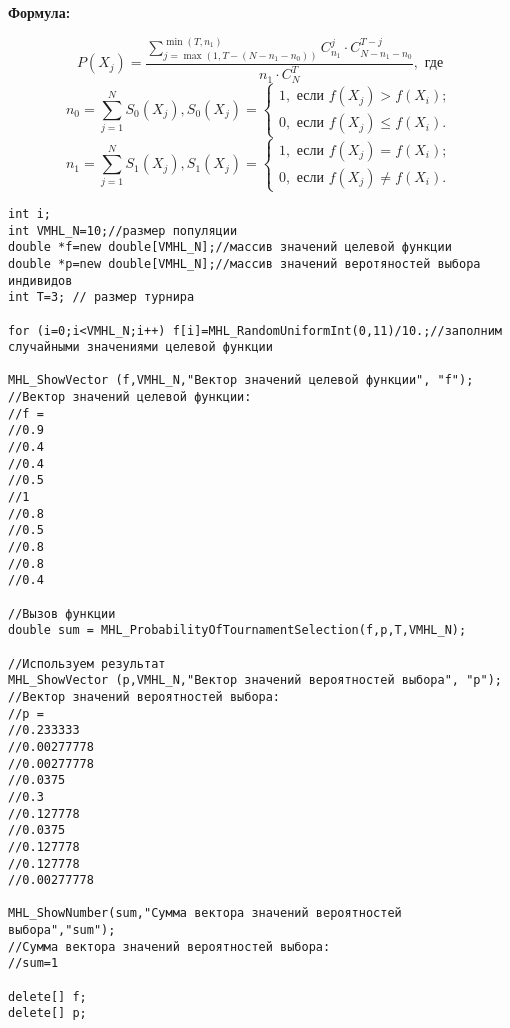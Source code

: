 \documentclass[a4paper,12pt]{article}
\begin{document}
 \textbf{Формула:}
 
\begin{equation*}
P\left( X_j\right) = \dfrac{\sum_{j=\max \left(1, T-\left( N-n_1-n_0\right)  \right) }^{\min \left( T, n_1\right) }C_{n_1}^j\cdot C_{ N-n_1-n_0}^{T-j}}{n_1\cdot C_N^T}, \text{ где}
\end{equation*}
\begin{equation*}
n_0=\sum_{j=1}^{N} S_0\left( X_j\right), S_0\left( X_j\right)=\left\lbrace \begin{aligned} 1, \text{ если } f\left( X_j\right)> f\left( X_i\right); \\ 0, \text{ если } f\left( X_j\right)\leq f\left( X_i\right). \end{aligned}\right.
\end{equation*}
\begin{equation*}
n_1=\sum_{j=1}^{N} S_1\left( X_j\right), S_1\left( X_j\right)=\left\lbrace \begin{aligned} 1, \text{ если } f\left( X_j\right)= f\left( X_i\right); \\ 0, \text{ если } f\left( X_j\right)\neq f\left( X_i\right). \end{aligned}\right.
\end{equation*}


\begin{lstlisting}[label=code_use_MHL_ProbabilityOfTournamentSelection,caption=Пример использования]
int i;
int VMHL_N=10;//размер популяции
double *f=new double[VMHL_N];//массив значений целевой функции
double *p=new double[VMHL_N];//массив значений веротяностей выбора индивидов
int T=3; // размер турнира

for (i=0;i<VMHL_N;i++) f[i]=MHL_RandomUniformInt(0,11)/10.;//заполним случайными значениями целевой функции

MHL_ShowVector (f,VMHL_N,"Вектор значений целевой функции", "f");
//Вектор значений целевой функции:
//f =
//0.9
//0.4
//0.4
//0.5
//1
//0.8
//0.5
//0.8
//0.8
//0.4

//Вызов функции
double sum = MHL_ProbabilityOfTournamentSelection(f,p,T,VMHL_N);

//Используем результат
MHL_ShowVector (p,VMHL_N,"Вектор значений вероятностей выбора", "p");
//Вектор значений вероятностей выбора:
//p =
//0.233333
//0.00277778
//0.00277778
//0.0375
//0.3
//0.127778
//0.0375
//0.127778
//0.127778
//0.00277778

MHL_ShowNumber(sum,"Сумма вектора значений вероятностей выбора","sum");
//Сумма вектора значений вероятностей выбора:
//sum=1

delete[] f;
delete[] p;
\end{lstlisting}
\end{document}
